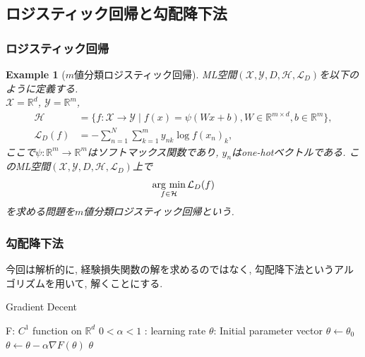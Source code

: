 \documentclass[dvipdfmx,11pt]{beamer}		%
\newtheorem{exam}[defi]{Example}
\newcommand{\R}{\mathbb{R}}
\newcommand{\X}{\mathcal{X}}
\newcommand{\Y}{\mathcal{Y}}
\newcommand{\Hil}{\mathcal{H}}
\newcommand{\Loss}{\mathcal{L}_{D}}
\newcommand{\MLsp}{(\X, \Y, D, \Hil, \Loss)}
\newcommand{\argmin}{\mathop{\rm arg~min}\limits}
\begin{document}
    \subsection{ロジスティック回帰と勾配降下法}
    \begin{frame}
        \frametitle{ロジスティック回帰}
        \begin{exam}[$m$値分類ロジスティック回帰]
            ML空間$\MLsp$を以下のように定義する.\\
            $\X=\R^d$, $\Y = \R^m$, 
            \begin{align*}
                \Hil &= \{f:\X\to\Y\mid f(x) = \psi(Wx + b), W\in\R^{m\times d}, b\in\R^m\},\\
                \Loss(f) &= -\sum_{n = 1}^{N}\sum_{k = 1}^{m}y_{nk}\log f(x_n)_{k},
            \end{align*}
            ここで$\psi:\R^m\to\R^m$はソフトマックス関数であり, $y_{n}$はone-hotベクトルである. このML空間$\MLsp$上で
            \begin{align*}
                \argmin_{f\in\Hil}\Loss(f)
            \end{align*}
            を求める問題を$m$値分類ロジスティック回帰という.
        \end{exam}
    \end{frame}
    \begin{frame}
        \frametitle{勾配降下法}
        今回は解析的に, 経験損失関数の解を求めるのではなく, 勾配降下法というアルゴリズムを用いて, 
        解くことにする. 
        \begin{algorithm}[H]
            \caption{Gradient Decent}
            \begin{algorithmic}
                \REQUIRE F: $C^1$ function on $\R^{d}$
                \REQUIRE $0<\alpha<1$ : learning rate 
                \REQUIRE $\theta$: Initial parameter vector
                \STATE $\theta\leftarrow\theta_{0}$
                \STATE $\theta\leftarrow\theta - \alpha\nabla F(\theta)$ 
                \ENDWHILE
                \RETURN $\theta$
            \end{algorithmic}
        \end{algorithm}
    \end{frame}
\end{document}
